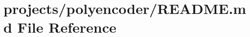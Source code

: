 \hypertarget{projects_2polyencoder_2README_8md}{}\section{projects/polyencoder/\+R\+E\+A\+D\+ME.md File Reference}
\label{projects_2polyencoder_2README_8md}
